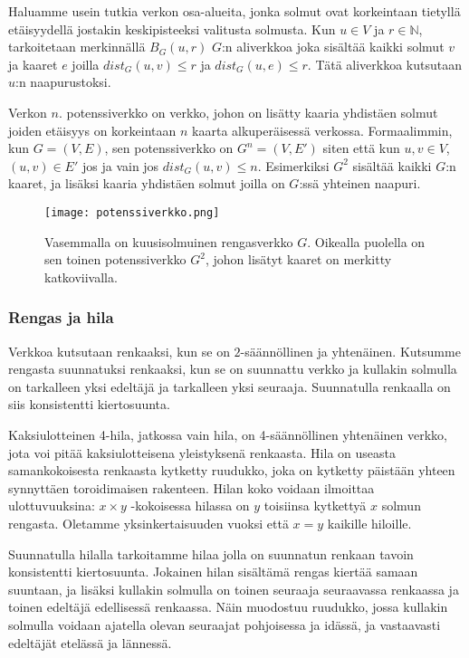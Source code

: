 \documentclass[12pt,finnish]{tktltiki2}
\theoremstyle{definition}
\theoremstyle{remark}
\begin{document}
Haluamme usein tutkia verkon osa-alueita, jonka solmut ovat korkeintaan tietyllä etäisyydellä jostakin keskipisteeksi valitusta solmusta. Kun $u \in V$ ja $r \in \mathbb{N}$, tarkoitetaan merkinnällä $B_G(u, r)$ $G$:n aliverkkoa joka sisältää kaikki solmut $v$ ja kaaret $e$ joilla $dist_G(u, v) \leq r$ ja $dist_G(u, e) \leq r$. Tätä aliverkkoa kutsutaan $u$:n naapurustoksi.

Verkon $n.$ potenssiverkko on verkko, johon on lisätty kaaria yhdistäen solmut joiden etäisyys on korkeintaan $n$ kaarta alkuperäisessä verkossa. Formaalimmin, kun $G = (V, E)$, sen potenssiverkko on $G^n = (V, E')$ siten että kun $u, v \in V$, $(u, v) \in E'$ jos ja vain jos $dist_G(u, v) \leq n$. Esimerkiksi $G^2$ sisältää kaikki $G$:n kaaret, ja lisäksi kaaria yhdistäen solmut joilla on $G$:ssä yhteinen naapuri.
\begin{figure}
  \texttt{[image: potenssiverkko.png]}
  \caption{Vasemmalla on kuusisolmuinen rengasverkko $G$. Oikealla puolella on sen toinen potenssiverkko $G^2$, johon lisätyt kaaret on merkitty katkoviivalla.}
\end{figure}




\subsubsection{Rengas ja hila}

Verkkoa kutsutaan renkaaksi, kun se on $2$-säännöllinen ja yhtenäinen. Kutsumme rengasta suunnatuksi renkaaksi, kun se on suunnattu verkko ja kullakin solmulla on tarkalleen yksi edeltäjä ja tarkalleen yksi seuraaja. Suunnatulla renkaalla on siis konsistentti kiertosuunta.

Kaksiulotteinen 4-hila, jatkossa vain hila, on 4-säännöllinen yhtenäinen verkko, jota voi pitää kaksiulotteisena yleistyksenä renkaasta. Hila on useasta samankokoisesta renkaasta kytketty ruudukko, joka on kytketty päistään yhteen synnyttäen toroidimaisen rakenteen. Hilan koko voidaan ilmoittaa ulottuvuuksina: $x \times y$ -kokoisessa hilassa on $y$ toisiinsa kytkettyä $x$ solmun rengasta. Oletamme yksinkertaisuuden vuoksi että $x = y$ kaikille hiloille.

Suunnatulla hilalla tarkoitamme hilaa jolla on suunnatun renkaan tavoin konsistentti kiertosuunta. Jokainen hilan sisältämä rengas kiertää samaan suuntaan, ja lisäksi kullakin solmulla on toinen seuraaja seuraavassa renkaassa ja toinen edeltäjä edellisessä renkaassa. Näin muodostuu ruudukko, jossa kullakin solmulla voidaan ajatella olevan seuraajat pohjoisessa ja idässä, ja vastaavasti edeltäjät etelässä ja lännessä.
\end{document}
